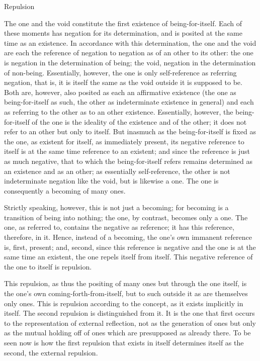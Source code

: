 Repulsion

The one and the void constitute the first existence of being-for-itself.
Each of these moments has negation for its determination,
and is posited at the same time as an existence.
In accordance with this determination,
the one and the void are each the reference
of negation to negation as of an other to its other:
the one is negation in the determination of being; the void,
negation in the determination of non-being.
Essentially, however, the one
is only self-reference as referring negation,
that is, it is itself the same as the
void outside it is supposed to be.
Both are, however, also posited as
each an affirmative existence
(the one as being-for-itself as such,
the other as indeterminate existence in general)
and each as referring to the other as to an other existence.
Essentially, however, the being-for-itself of the one
is the ideality of the existence and of the other;
it does not refer to an other but only to itself.
But inasmuch as the being-for-itself is fixed as the one,
as existent for itself, as immediately present,
its negative reference to itself is
at the same time reference to an existent;
and since the reference is just as much negative,
that to which the being-for-itself refers remains
determined as an existence and as an other;
as essentially self-reference,
the other is not indeterminate negation like the void,
but is likewise a one.
The one is consequently a becoming of many ones.

Strictly speaking, however, this is not just a becoming;
for becoming is a transition of being into nothing;
the one, by contrast, becomes only a one.
The one, as referred to, contains
the negative as reference;
it has this reference, therefore, in it.
Hence, instead of a becoming,
the one's own immanent reference is,
first, present;
and, second, since this reference is negative
and the one is at the same time an existent,
the one repels itself from itself.
This negative reference of
the one to itself is repulsion.

This repulsion, as thus the positing of many ones
but through the one itself, is the one's
own coming-forth-from-itself,
but to such outside it as are themselves only ones.
This is repulsion according to the concept,
as it exists implicitly in itself.
The second repulsion is distinguished from it.
It is the one that first occurs to
the representation of external reflection,
not as the generation of ones
but only as the mutual holding off of ones
which are presupposed as already there.
To be seen now is how the first repulsion
that exists in itself determines itself
as the second, the external repulsion.

